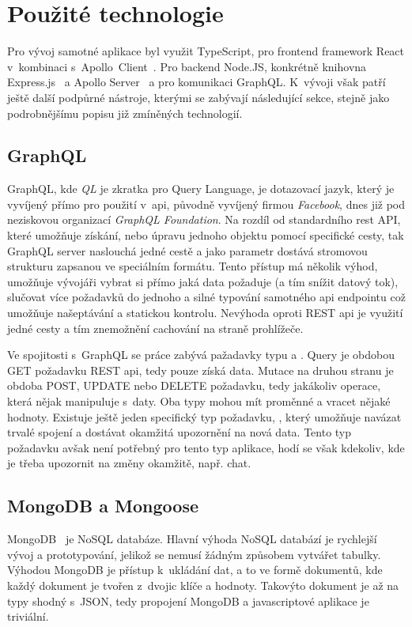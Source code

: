 \section{Použité technologie}
\label{sc:used_techologies}
Pro vývoj samotné aplikace byl využit TypeScript, pro frontend framework React v~kombinaci s~Apollo~Client~\cite{meteordevelopmentgroupinc_2019_apollo}. Pro backend Node.JS, konkrétně knihovna Express.js~\cite{expresscontributors_2017_express} a Apollo Server~\cite{meteordevelopmentgroupinc_2019_apollo} a pro komunikaci GraphQL. K~vývoji však patří ještě další podpůrné nástroje, kterými se zabývají následující sekce, stejně jako podrobnějšímu popisu již zmíněných technologií.

\subsection{GraphQL}
\label{ss:graphql}
GraphQL, kde \emph{QL} je zkratka pro Query Language, je dotazovací jazyk, který je vyvíjený přímo pro použití v~\acrshort{api}, původně vyvíjený firmou \emph{Facebook}, dnes již pod neziskovou organizací \emph{GraphQL Foundation}. Na rozdíl od standardního \acrshort{rest} API, které umožňuje získání, nebo úpravu jednoho objektu pomocí specifické cesty, tak GraphQL server naslouchá jedné cestě a jako parametr dostává stromovou strukturu zapsanou ve speciálním formátu. Tento přístup má několik výhod, umožňuje vývojáři vybrat si přímo jaká data požaduje (a tím snížit datový tok), slučovat více požadavků do jednoho a silné typování samotného \acrshort{api} endpointu což umožňuje našeptávání a statickou kontrolu. Nevýhoda oproti REST \acrshort{api} je využití jedné cesty a tím znemožnění cachování na straně prohlížeče.~\cite{brito2020rest}

Ve spojitosti s~GraphQL se práce zabývá pažadavky typu  a . Query je obdobou GET požadavku REST \acrshort{api}, tedy pouze získá data. Mutace na druhou stranu je obdoba POST, UPDATE nebo DELETE požadavku, tedy jakákoliv operace, která nějak manipuluje s~daty. Oba typy mohou mít proměnné a vracet nějaké hodnoty. Existuje ještě jeden specifický typ požadavku, , který umožňuje navázat trvalé spojení a dostávat okamžitá upozornění na nová data. Tento typ požadavku avšak není potřebný pro tento typ aplikace, hodí se však kdekoliv, kde je třeba upozornit na změny okamžitě, např. chat.~\cite{porcello_2018_learning}

\subsection{MongoDB a Mongoose}
\label{ss:mongoose}
MongoDB~\cite{mongodbinc_2019_the} je NoSQL databáze. Hlavní výhoda NoSQL databází je rychlejší vývoj a prototypování, jelikož se nemusí žádným způsobem vytvářet tabulky. Výhodou MongoDB je přístup k~ukládání dat, a to ve formě dokumentů, kde každý dokument je tvořen z~dvojic klíče a hodnoty. Takovýto dokument je až na typy shodný s~JSON, tedy propojení MongoDB a javascriptové aplikace je triviální.

